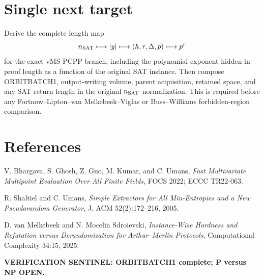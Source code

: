 \documentclass[11pt]{article}
\begin{document}
\section*{Single next target}
Derive the complete length map
\[
n_{\rm SAT}\longmapsto |y|\longmapsto (h,r,\Delta,p)\longmapsto p^r
\]
for the exact vMS PCPP branch, including the polynomial exponent hidden in proof length as a function of the original SAT instance. Then compose ORBITBATCH1, output-writing volume, parent acquisition, retained space, and any SAT return length in the original \(n_{\rm SAT}\) normalization. This is required before any Fortnow--Lipton--van Melkebeek--Viglas or Buss--Williams forbidden-region comparison.

\section*{References}
V. Bhargava, S. Ghosh, Z. Guo, M. Kumar, and C. Umans, \emph{Fast Multivariate Multipoint Evaluation Over All Finite Fields}, FOCS 2022; ECCC TR22-063.

R. Shaltiel and C. Umans, \emph{Simple Extractors for All Min-Entropies and a New Pseudorandom Generator}, J. ACM 52(2):172--216, 2005.

D. van Melkebeek and N. Mocelin Sdroievski, \emph{Instance-Wise Hardness and Refutation versus Derandomization for Arthur--Merlin Protocols}, Computational Complexity 34:15, 2025.

\bigskip\noindent\textbf{VERIFICATION SENTINEL: ORBITBATCH1 complete; P versus NP OPEN.}
\end{document}

